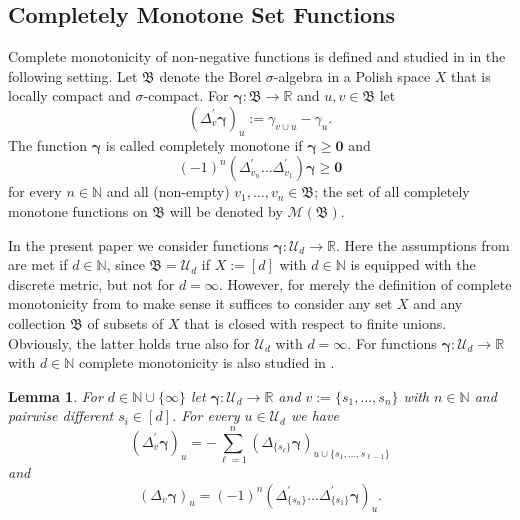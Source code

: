 \documentclass{article}
\newcommand{\R}  {{\mathbb R}}
\newcommand{\N}  {{\mathbb N}}
\newcommand{\bg}{{\boldsymbol{\gamma}}}
\newcommand{\bn}{{\boldsymbol{0}}}
\newcommand{\B}{{\mathfrak B}}
\newcommand{\U}  {\mathcal{U}}
\newcommand{\M}  {\mathcal{M}}
\theoremstyle{plain}
\newtheorem{lemma}{Lemma}
\theoremstyle{definition}
\begin{document}
\subsection{Completely Monotone Set Functions}\label{a1}

Complete monotonicity of non-negative functions is defined and 
studied in \citet{Kurtz74} in the following setting.
Let $\B$ denote the Borel $\sigma$-algebra in a Polish
space $X$ that is locally compact and $\sigma$-compact. For 
$\bg \colon \B \to \R$ and $u, v \in \B$ let
\[
\left(\Delta^\prime_v \bg \right)_u := 
\gamma_{v \cup u} - \gamma_u.
\]
The function $\bg$
is called completely monotone if $\bg \geq \bn$ and
\[
(-1)^n 
\left( \Delta^\prime_{v_n} \dots \Delta^\prime_{v_1} \right) 
\bg \geq \bn 
\]
for every $n \in \N$ and all (non-empty) 
$v_1, \dots, v_n \in \B$; 
the set of all completely monotone functions 
on $\B$ will be denoted by $\M(\B)$. 

In the present paper we consider 
functions $\bg \colon \U_d \to \R$. 
Here the assumptions from \citet{Kurtz74} are met
if $d \in \N$, since $\B = \U_d$ if $X := [d]$ with $d \in \N$
is equipped with the discrete metric, but not
for $d = \infty$. However, for merely the definition of complete 
monotonicity from \citet{Kurtz74} to make sense it suffices to consider 
any set $X$ and any collection $\B$ of subsets of $X$ that is closed
with respect to finite unions. Obviously, the latter holds
true also for $\U_d$ with $d = \infty$.
For functions $\bg \colon \U_d \to \R$ with
$d \in \N$ complete monotonicity is also studied in
\citet{Matus94}.

\begin{lemma}
For $d \in \N \cup \{\infty\}$ let $\bg \colon \U_d \to \R$ and
$v := \{s_1,\dots, s_n\}$ with $n \in \N$ and pairwise 
different $s_i \in [d]$. 
For every $u \in \U_d$ we have 
\begin{equation}\label{g8}
\left( \Delta^\prime_{v} \bg \right)_u
= - \sum_{\ell=1}^n \left( 
\Delta_{\{s_\ell\}} \bg\right)_{u \cup \{s_1,\dots,s_{\ell-1}\}}
\end{equation}
and
\begin{equation}\label{g9}
\left( \Delta_v \bg \right)_u =
(-1)^n 
\left( \Delta^\prime_{\{s_n\}} \dots 
       \Delta^\prime_{\{s_1\}} \bg \right)_u.
\end{equation}
\end{lemma}
\end{document}
